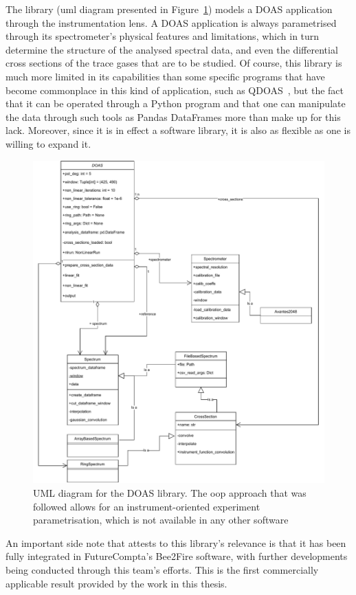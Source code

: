 The library (\gls{uml} diagram presented in
Figure~\ref{fig:doas_library}) models a \gls{DOAS} application through
the instrumentation lens. A \gls{DOAS} application is always
parametrised through its spectrometer's physical features and
limitations, which in turn determine the structure of the analysed
spectral data, and even the differential cross sections of the trace
gases that are to be studied. Of course, this library is much more
limited in its capabilities than some specific programs that have become
commonplace in this kind of application, such as
QDOAS~\cite{Danckaert2015}, but the fact that it can be operated through
a Python program and that one can manipulate the data through such tools
as Pandas DataFrames more than make up for this lack. Moreover, since it
is in effect a software library, it is also as flexible as one is
willing to expand it.

\begin{figure}[htpb]
    \centering
    \includegraphics[width=0.8\linewidth]{img/pdf/uml_doas.pdf}
    \caption{UML diagram for the \gls{DOAS} library. The \gls{oop}
    approach that was followed allows for an instrument-oriented
    experiment parametrisation, which is not available in any other
    software}
    \label{fig:doas_library}
\end{figure}

An important side note that attests to this library's relevance is that
it has been fully integrated in FutureCompta's Bee2Fire software, with
further developments being conducted through this team's efforts. This
is the first commercially applicable result provided by the work in this
thesis.
